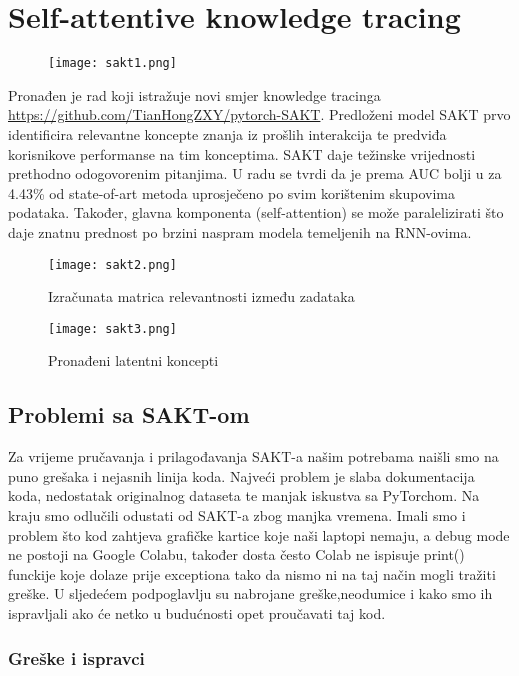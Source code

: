 
\chapter{Self-attentive knowledge tracing}
	\begin{figure}[!htb]
		\centering
		\texttt{[image: sakt1.png]}
		\caption{}
		\label{}
	\end{figure}
	Pronađen je rad koji istražuje novi smjer knowledge tracinga \url{https://github.com/TianHongZXY/pytorch-SAKT}. Predloženi model SAKT prvo identificira relevantne koncepte znanja iz prošlih interakcija te predviđa korisnikove performanse na tim konceptima. SAKT daje težinske vrijednosti prethodno odogovorenim pitanjima. U radu se tvrdi da je prema AUC bolji u za 4.43\% od state-of-art metoda uprosječeno po svim korištenim skupovima podataka. Također, glavna komponenta (self-attention) se može paralelizirati što daje znatnu prednost po brzini naspram modela temeljenih na RNN-ovima.

		\begin{figure}[H]
		\centering
		\texttt{[image: sakt2.png]}
		\caption{Izračunata matrica relevantnosti između zadataka}
		\label{}
	\end{figure}
	\begin{figure}[!htb]
	\centering
	\texttt{[image: sakt3.png]}
	\caption{Pronađeni latentni koncepti}
	\label{}
\end{figure}
	\section{Problemi sa SAKT-om}
	Za vrijeme pručavanja i prilagođavanja SAKT-a našim potrebama naišli smo na puno grešaka i nejasnih linija koda. Najveći problem je slaba dokumentacija koda, nedostatak originalnog dataseta te manjak iskustva sa PyTorchom.
	Na kraju smo odlučili odustati od SAKT-a zbog manjka vremena. Imali smo i problem što kod zahtjeva grafičke kartice koje naši laptopi nemaju, a debug mode ne postoji na Google Colabu, također dosta često Colab ne ispisuje print() funckije koje dolaze prije exceptiona tako da nismo ni na taj način mogli tražiti greške. U sljedećem podpoglavlju su nabrojane greške,neodumice i kako smo ih ispravljali ako će netko u budućnosti opet proučavati taj kod.
	\subsection{Greške i ispravci}
	
